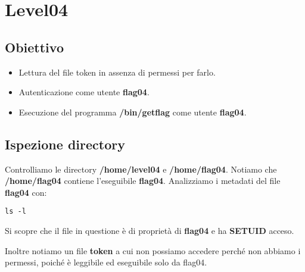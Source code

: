 \section{Level04}
\subsection{Obiettivo}
\begin{itemize}
    \item Lettura del file token in assenza di permessi per farlo.
    \item Autenticazione come utente \textbf{flag04}.
    \item Esecuzione del programma \textbf{/bin/getflag} come utente \textbf{flag04}.
\end{itemize}

\subsection{Ispezione directory}
Controlliamo le directory \textbf{/home/level04} e \textbf{/home/flag04}. Notiamo che \textbf{/home/flag04} contiene l’eseguibile \textbf{flag04}.
Analizziamo i metadati del file \textbf{flag04} con: 
\begin{lstlisting}[style=bashstyle]
    ls -l
\end{lstlisting}
Si scopre che il file in questione è di proprietà di \textbf{flag04} e ha \textbf{SETUID} acceso.

Inoltre notiamo un file \textbf{token} a cui non possiamo accedere perché non abbiamo i permessi, poiché è leggibile ed eseguibile solo da flag04.

